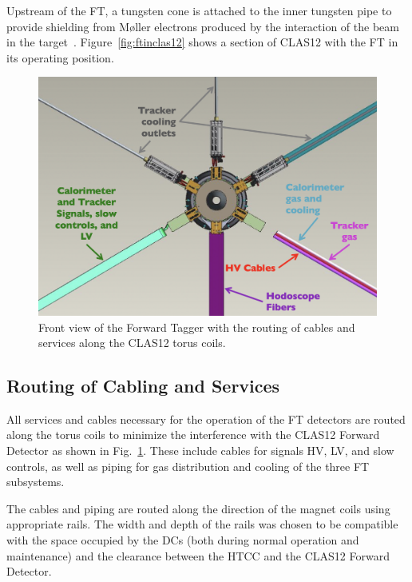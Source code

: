 Upstream of the FT, a tungsten cone is attached to the inner tungsten pipe to provide shielding from M{\o}ller
electrons produced by the interaction of the beam in the target~\cite{beamline}. Figure~\ref{fig:ftinclas12} shows a
section of CLAS12 with the FT in its operating position.

\begin{figure}
\includegraphics[width=1.0\columnwidth]{./fig/ft_cables.png}
\caption{Front view of the Forward Tagger with the routing of cables and services along the CLAS12 torus coils.}
\label{fig:integra}
\end{figure}

\subsection{Routing of Cabling and Services}

All services and cables necessary for the operation of the FT detectors are routed along the torus coils to minimize
the interference with the CLAS12 Forward Detector as shown in Fig.~\ref{fig:integra}. These include cables for signals
HV, LV, and slow controls, as well as piping for gas distribution and cooling of the three FT subsystems.

The cables and piping are routed along the direction of the magnet coils using appropriate rails. The
width and depth of the rails was chosen to be compatible with the space occupied by the DCs (both during
normal operation and maintenance) and the clearance between the HTCC and the CLAS12 Forward Detector.
